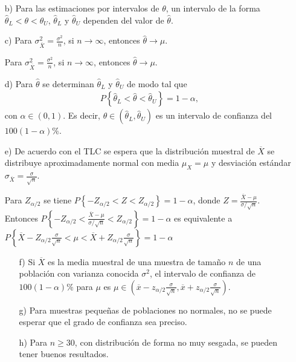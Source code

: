 \begin{itemize}
\begin{enumerate}
\item[b) ]Para las estimaciones por intervalos de $\theta$, un intervalo de la forma $\hat{\theta}_{L}<\theta<\hat{\theta}_{U}$,  $\hat{\theta}_{L}$ y $\hat{\theta}_{U}$ dependen del valor de $\hat{\theta}$.
\item[c) ]Para $\sigma_{\overline{X}}^{2}=\frac{\sigma^{2}}{n}$, si $n\rightarrow\infty$, entonces $\hat{\theta}\rightarrow\mu$.


Para $\sigma_{\overline{X}}^{2}=\frac{\sigma^{2}}{n}$, si $n\rightarrow\infty$,  entonces $\hat{\theta}\rightarrow\mu$.

\item[d) ]Para $\hat{\theta}$ se determinan $\hat{\theta}_{L}$ y $\hat{\theta}_{U}$ de modo tal que 
\begin{eqnarray}
P\left\{\hat{\theta}_{L}<\hat{\theta}<\hat{\theta}_{U}\right\}=1-\alpha,
\end{eqnarray}
con $\alpha\in\left(0,1\right)$. Es decir, $\theta\in\left(\hat{\theta}_{L},\hat{\theta}_{U}\right)$ es un intervalo de confianza del $100\left(1-\alpha\right)\%$.

\item[e) ] De acuerdo con el TLC se espera que la distribuci\'on muestral de $\overline{X}$ se distribuye aproximadamente normal con media $\mu_{X}=\mu$ y desviaci\'on est\'andar $\sigma_{\overline{X}}=\frac{\sigma}{\sqrt{n}}$.

Para $Z_{\alpha/2}$ se tiene $P\left\{-Z_{\alpha/2}<Z<Z_{\alpha/2}\right\}=1-\alpha$, donde $Z=\frac{\overline{X}-\mu}{\sigma/\sqrt{n}}$. Entonces
$P\left\{-Z_{\alpha/2}<\frac{\overline{X}-\mu}{\sigma/\sqrt{n}}<Z_{\alpha/2}\right\}=1-\alpha$ es equivalente a 
$P\left\{\overline{X}-Z_{\alpha/2}\frac{\sigma}{\sqrt{n}}<\mu<\overline{X}+Z_{\alpha/2}\frac{\sigma}{\sqrt{n}}\right\}=1-\alpha$ 

\begin{enumerate}
\item[f) ]Si $\overline{X}$ es la media muestral de una muestra de tama\~no $n$ de una poblaci\'on con varianza conocida $\sigma^{2}$, el intervalo de confianza de $100\left(1-\alpha\right)\%$ para $\mu$ es $\mu\in\left(\overline{x}-z_{\alpha/2}\frac{\sigma}{\sqrt{n}},\overline{x}+z_{\alpha/2}\frac{\sigma}{\sqrt{n}}\right)$.

\item[g) ] Para muestras peque\~nas de poblaciones no normales, no se puede esperar que el grado de confianza sea preciso.
\item[h) ] Para $n\geq30$, con distribuci\'on de forma no muy sesgada, se pueden tener buenos resultados.
\end{enumerate}


\end{enumerate}
\end{itemize}
